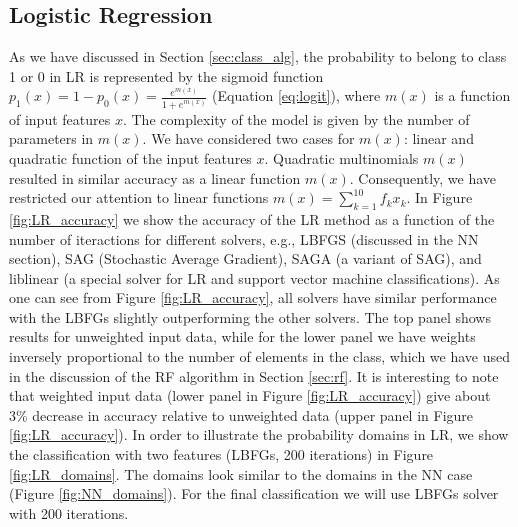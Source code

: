 \subsection{Logistic Regression}

As we have discussed in Section \ref{sec:class_alg}, 
the probability to belong to class 1 or 0 in LR is represented by the sigmoid function
$p_1(x) = 1 - p_0(x) = \frac{e^{m(x)}}{1 + e^{m(x)}}$ (Equation \ref{eq:logit}),
where $m(x)$ is a function of input features $x$.
The complexity of the model is given by the number of parameters in $m(x)$.
We have considered two cases for $m(x)$: linear and quadratic function of the input features $x$.
Quadratic multinomials $m(x)$ resulted in similar accuracy as a linear function $m(x)$.
Consequently, we have restricted our attention to linear functions $m(x) = \sum_{k = 1}^{10} f_k x_k$.
In Figure \ref{fig:LR_accuracy} we show the accuracy of the LR method as a function of the number of iteractions
for different solvers, e.g., LBFGS (discussed in the NN section), SAG (Stochastic Average Gradient), SAGA (a variant of SAG),
and liblinear (a special solver for LR and support vector machine classifications).
As one can see from Figure \ref{fig:LR_accuracy}, all solvers have similar performance with the LBFGs slightly outperforming the other solvers.
The top panel shows results for unweighted input data, while for the lower panel we have weights inversely proportional to the number
of elements in the class, which we have used in the discussion of the RF algorithm in Section \ref{sec:rf}.
It is interesting to note that weighted input data (lower panel in Figure \ref{fig:LR_accuracy}) give about 3\% decrease in accuracy relative to unweighted data (upper panel in Figure \ref{fig:LR_accuracy}).
In order to illustrate the probability domains in LR, we show the classification with two features (LBFGs, 200 iterations)
in Figure \ref{fig:LR_domains}. The domains look similar to the domains in the NN case (Figure \ref{fig:NN_domains}).
For the final classification we will use LBFGs solver with 200 iterations.



